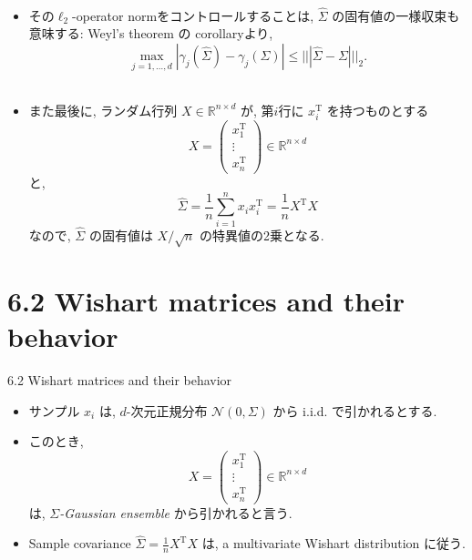 \documentclass[unicode,aspectratio=169,11pt]{beamer}
\newcommand{\bb}{\mathbb}
\newcommand{\tr}{\mathrm{T}}
\begin{document}
\begin{frame}{}{}
　\\
  \begin{itemize}
    \item その$\ell_2$-operator normをコントロールすることは, $\widehat{\Sigma}$ の固有値の一様収束も意味する: Weyl's theorem の corollaryより,
    \[ \max_{j = 1, \dots, d} \left|\gamma_j(\widehat{\Sigma}) - \gamma_j\left(\Sigma\right)\right| \le |||\widehat{\Sigma} - \Sigma|||_2. \tag{6.7} \]
    　\\
    \item また最後に, ランダム行列 $X \in \bb{R}^{n \times d}$ が, 第$i$行に $x_i^\tr$ を持つものとする
    \[
      X =
      \begin{pmatrix}
        x_1^\tr\\
        \vdots\\
        x_n^\tr
      \end{pmatrix} \in \bb{R}^{n \times d}
    \]
    と,
    \[ \widehat{\Sigma} = \frac{1}{n}\sum_{i=1}^n x_i x_i^\tr = \frac{1}{n}X^\tr X \]
    なので, $\widehat{\Sigma}$ の固有値は $X / \sqrt{n}$ の特異値の2乗となる.
  \end{itemize}
\end{frame}

\section{6.2 Wishart matrices and their behavior}
\begin{frame}{6.2 Wishart matrices and their behavior}
  \begin{itemize}
    \item サンプル $x_i$ は, $d$-次元正規分布 $\mathcal{N}(0, \Sigma)$ から i.i.d. で引かれるとする.
    \item このとき,
    \[
      X =
      \begin{pmatrix}
        x_1^\tr\\
        \vdots\\
        x_n^\tr
      \end{pmatrix} \in \bb{R}^{n \times d}
    \]
    は, {\it $\Sigma$-Gaussian ensemble} から引かれると言う.
    \item Sample covariance $\widehat{\Sigma} = \frac{1}{n}X^\tr X$ は, {a multivariate Wishart distribution} に従う.
  \end{itemize}
\end{frame}
\end{document}
